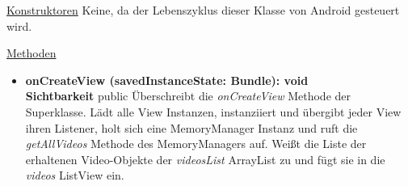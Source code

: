 \underline{Konstruktoren}\newline
\indent Keine, da der Lebenszyklus dieser Klasse von Android gesteuert wird.\newline

\underline{Methoden}
\begin{itemize}
\itemsep0pt
\item \textbf{onCreateView (savedInstanceState: Bundle): void}\hfill\\
\textbf{Sichtbarkeit} public\newline
Überschreibt die \textit{onCreateView} Methode der Superklasse. Lädt alle View Instanzen, instanziiert und übergibt jeder View ihren Listener, holt sich eine MemoryManager Instanz und ruft die \textit{getAllVideos} Methode des MemoryManagers auf. Weißt die Liste der erhaltenen Video-Objekte der \textit{videosList} ArrayList zu und fügt sie in die \textit{videos} ListView ein.

\end{itemize}
